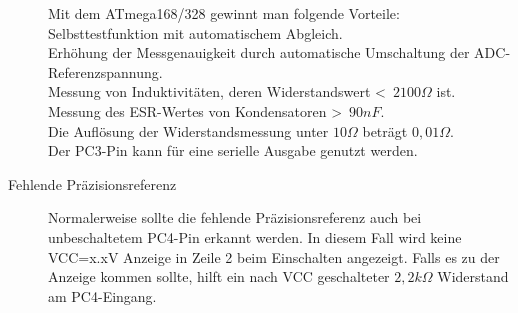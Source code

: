 \begin{description}
Mit dem ATmega168/328 gewinnt man folgende Vorteile:
Selbsttestfunktion mit automatischem Abgleich.\\
Erhöhung der Messgenauigkeit durch automatische Umschaltung der ADC-Referenzspannung.\\
Messung von Induktivitäten, deren Widerstandswert \textless~\(2100\Omega\) ist.\\
Messung des ESR-Wertes von Kondensatoren \textgreater~\(90nF\).\\
Die Auflösung der Widerstandsmessung unter \(10\Omega\) beträgt \(0,01\Omega\).\\
Der PC3-Pin kann für eine serielle Ausgabe genutzt werden.
\item[Fehlende Präzisionsreferenz]
Normalerweise sollte die fehlende Präzisionsreferenz auch bei unbeschaltetem PC4-Pin
erkannt werden. In diesem Fall wird keine VCC=x.xV Anzeige in Zeile 2 beim Einschalten
angezeigt. Falls es zu der Anzeige kommen sollte, hilft ein nach VCC geschalteter 
\(2,2k\Omega\) Widerstand am PC4-Eingang.
\end{description}

